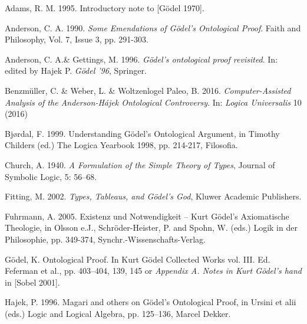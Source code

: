 \documentclass[smallextended]{svjour3}
\begin{document}





\begin{thebibliography}{9}

Adams, R. M. 1995. Introductory note to [G\"odel 1970]. 

Anderson, C. A. 1990. {\itshape Some Emendations of G\"odel's Ontological Proof}. Faith and Philosophy, Vol. 7, Issue 3, pp. 291-303. 

Anderson, C. A.\& Gettings, M. 1996.  {\itshape G\"odel's ontological proof revisited}. In: edited by Hajek P. {\itshape G\"odel '96},  Springer. 

Benzm\"uller, C. \& Weber, L. \& Woltzenlogel Paleo, B. 2016. {\itshape Computer-Assisted Analysis of the Anderson-H\'ajek Ontological Controversy}. In: {\itshape Logica Universalis} 10 (2016)


Bj{\o}rdal, F. 1999. Understanding G\"odel's Ontological Argument, in Timothy Childers (ed.) The Logica Yearbook 1998, pp. 214-217, Filosofia.

Church, A. 1940. {\itshape A Formulation of the Simple Theory of Types}, Journal of Symbolic Logic, 5: 56--68. 

Fitting, M. 2002.  {\itshape Types, Tableaus, and G\"odel's God}, Kluwer Academic Publishers.  

Fuhrmann, A. 2005.
Existenz und Notwendigkeit -- Kurt G\"odel's Axiomatische Theologie, in Olsson e.J., Schr\"oder-Heister, P. and Spohn, W. (eds.) Logik in der Philosophie, pp. 349-374, Synchr.-Wissenschafts-Verlag.

G\"odel, K. Ontological Proof. In Kurt G\"odel Collected Works vol. III. Ed. Feferman et al., pp. 403--404, 139, 145 or {\itshape Appendix A. Notes in Kurt G\"odel's hand} in [Sobel 2001]. 

Hajek, P. 1996. Magari and others on G\"odel's Ontological Proof, in Ursini et alii
(eds.) Logic and Logical Algebra, pp. 125--136, Marcel Dekker.


\end{thebibliography}
\end{document}
